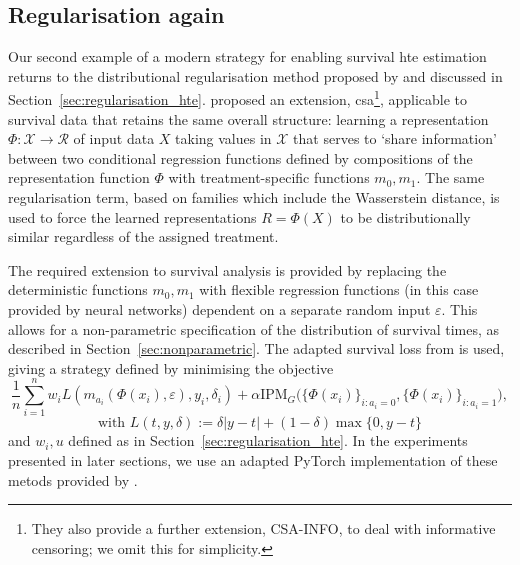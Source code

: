 \documentclass[../thesis.tex]{subfiles}
\begin{document}
\subsection{Regularisation again \label{sec:surv_reg}}
Our second example of a modern strategy for enabling survival \gls{hte} estimation returns to the distributional regularisation method proposed by \citet{shalit_estimating_2017} and discussed in Section~\ref{sec:regularisation_hte}. \citet{chapfuwa_enabling_2021} proposed an extension, \gls{csa}\footnote{They also provide a further extension, CSA-INFO, to deal with informative censoring; we omit this for simplicity.}, applicable to survival data that retains the same overall structure: learning a representation $\Phi \colon \mathcal{X} \rightarrow \mathcal{R}$ of input data $X$ taking values in $\mathcal{X}$ that serves to `share information' between two conditional regression functions defined by compositions of the representation function $\Phi$ with treatment-specific functions $m_0,m_1$. The same regularisation term, based on  families which include the Wasserstein distance, is used to force the learned representations $R=\Phi(X)$ to be distributionally similar regardless of the assigned treatment. 

The required extension to survival analysis is provided by replacing the deterministic functions $m_0, m_1$ with flexible regression functions (in this case provided by neural networks) dependent on a separate random input $\varepsilon$. This allows for a non-parametric specification of the distribution of survival times, as described in Section~\ref{sec:nonparametric}. The adapted survival loss from \citet{chapfuwa_adversarial_2018} is used, giving a strategy defined by minimising the objective 
\[\frac{1}{n}\sum_{i=1}^n w_i L(m_{a_i}(\Phi(x_i), \varepsilon), y_i, \delta_i) + \alpha \mathrm{IPM}_G\big(\{\Phi(x_i)\}_{i:a_i=0}, \{\Phi(x_i)\}_{i:a_i=1}\big),\]
\[\text{with } L(t, y, \delta) := \delta|y-t| + (1-\delta)\max\{0, y-t\} \]
and $w_i, u$ defined as in Section~\ref{sec:regularisation_hte}. In the experiments presented in later sections, we use an adapted PyTorch \citep{paszke_pytorch_2019} implementation of these metods provided by \citep{chapfuwa_enabling_2021}.
\end{document}
